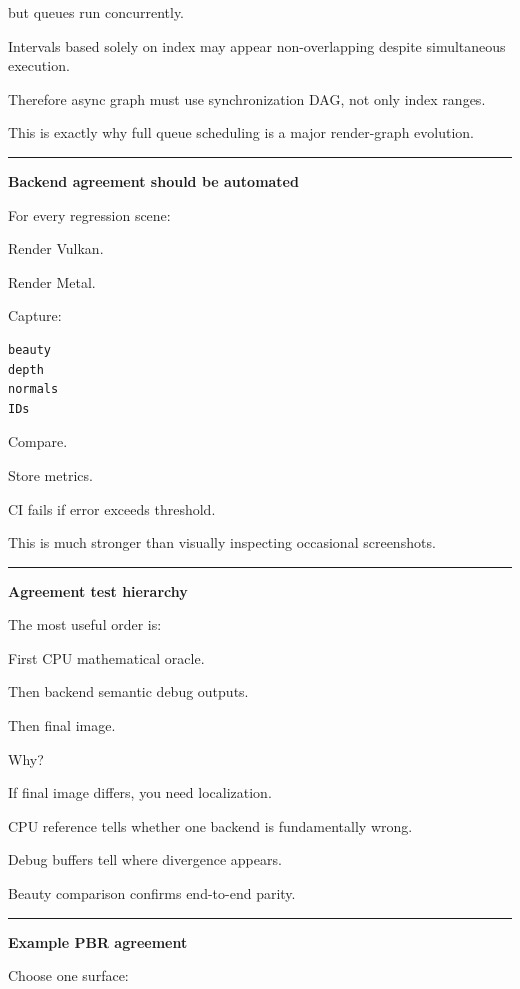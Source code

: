 but queues run concurrently.

Intervals based solely on index may appear non-overlapping despite simultaneous execution.

Therefore async graph must use synchronization DAG, not only index ranges.

This is exactly why full queue scheduling is a major render-graph evolution.

\begin{center}\rule{0.5\linewidth}{0.5pt}\end{center}

\textbf{Backend agreement should be automated}

For every regression scene:

Render Vulkan.

Render Metal.

Capture:

\begin{verbatim}
beauty
depth
normals
IDs
\end{verbatim}

Compare.

Store metrics.

CI fails if error exceeds threshold.

This is much stronger than visually inspecting occasional screenshots.

\begin{center}\rule{0.5\linewidth}{0.5pt}\end{center}

\textbf{Agreement test hierarchy}

The most useful order is:

First CPU mathematical oracle.

Then backend semantic debug outputs.

Then final image.

Why?

If final image differs, you need localization.

CPU reference tells whether one backend is fundamentally wrong.

Debug buffers tell where divergence appears.

Beauty comparison confirms end-to-end parity.

\begin{center}\rule{0.5\linewidth}{0.5pt}\end{center}

\textbf{Example PBR agreement}

Choose one surface:

